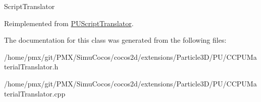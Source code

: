 Script\+Translator 

Reimplemented from \hyperlink{classPUScriptTranslator_a9ff2cdfda9ea8db6fd716e7b69dbe79b}{P\+U\+Script\+Translator}.



The documentation for this class was generated from the following files\+:\begin{DoxyCompactItemize}
\item 
/home/pmx/git/\+P\+M\+X/\+Simu\+Cocos/cocos2d/extensions/\+Particle3\+D/\+P\+U/C\+C\+P\+U\+Material\+Translator.\+h\item 
/home/pmx/git/\+P\+M\+X/\+Simu\+Cocos/cocos2d/extensions/\+Particle3\+D/\+P\+U/C\+C\+P\+U\+Material\+Translator.\+cpp\end{DoxyCompactItemize}
